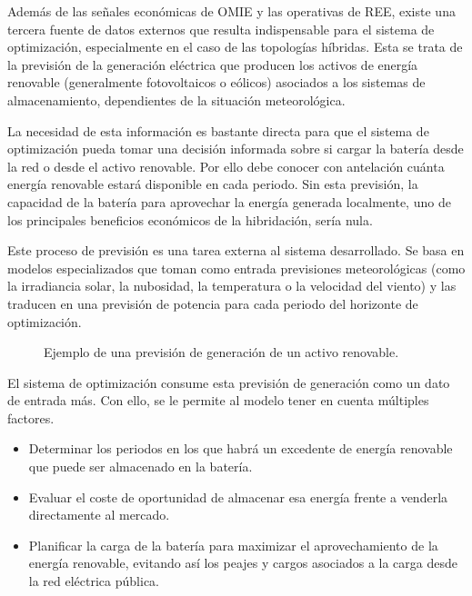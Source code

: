 Además de las señales económicas de OMIE y las operativas de REE, existe una tercera fuente de datos externos que resulta indispensable para el sistema de optimización, especialmente en el caso de las topologías híbridas. Esta se trata de la previsión de la generación eléctrica que producen los activos de energía renovable (generalmente fotovoltaicos o eólicos) asociados a los sistemas de almacenamiento, dependientes de la situación meteorológica.

La necesidad de esta información es bastante directa para que el sistema de optimización pueda tomar una decisión informada sobre si cargar la batería desde la red o desde el activo renovable. Por ello debe conocer con antelación cuánta energía renovable estará disponible en cada periodo. Sin esta previsión, la capacidad de la batería para aprovechar la energía generada localmente, uno de los principales beneficios económicos de la hibridación, sería nula.

Este proceso de previsión es una tarea externa al sistema desarrollado. Se basa en modelos especializados que toman como entrada previsiones meteorológicas (como la irradiancia solar, la nubosidad, la temperatura o la velocidad del viento) y las traducen en una previsión de potencia para cada periodo del horizonte de optimización.

\begin{figure}
  \centering
  \caption{Ejemplo de una previsión de generación de un activo renovable.}
  \label{fig:prevision-renovable}
\end{figure}

El sistema de optimización consume esta previsión de generación como un dato de entrada más. Con ello, se le permite al modelo tener en cuenta múltiples factores.

\begin{itemize}

  \item Determinar los periodos en los que habrá un excedente de energía renovable que puede ser almacenado en la batería.

  \item Evaluar el coste de oportunidad de almacenar esa energía frente a venderla directamente al mercado.

  \item Planificar la carga de la batería para maximizar el aprovechamiento de la energía renovable, evitando así los peajes y cargos asociados a la carga desde la red eléctrica pública.

\end{itemize}


